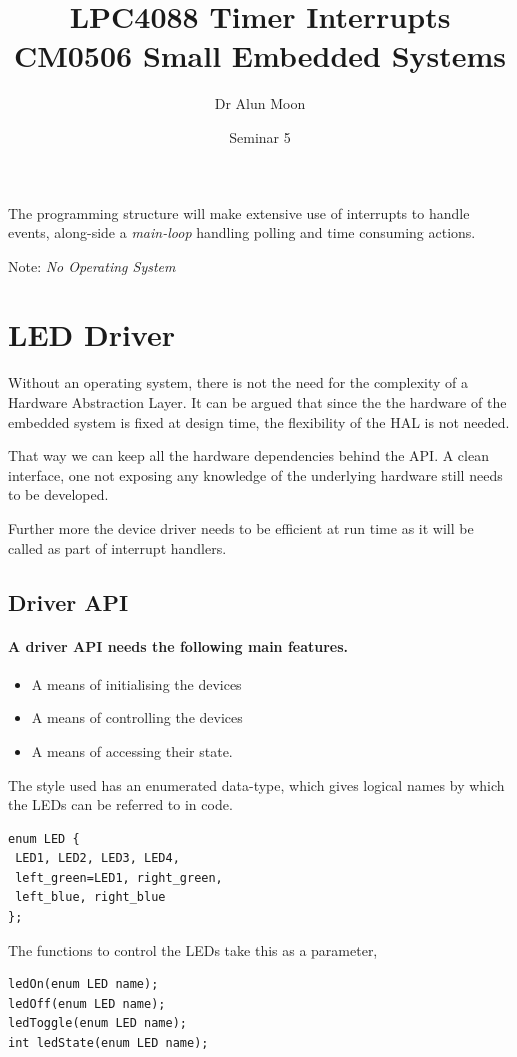 \documentclass[a4paper]{tufte-handout}
\title{LPC4088 Timer Interrupts\\\small{CM0506 Small Embedded Systems}}
\author{Dr Alun Moon}
\date{Seminar 5}
\begin{document}
\maketitle

The programming structure will make extensive use of interrupts to
handle events, along-side a \emph{main-loop} handling polling and time
consuming actions.

Note: \emph{No Operating System}

\section{LED Driver}
Without an operating system, there is not the need for the complexity
of a Hardware Abstraction Layer.  It can be argued that since the the
hardware of the embedded system is fixed at design time, the
flexibility of the HAL is not needed.
 
  That way we can keep all the hardware dependencies behind
the API.  A clean interface, one not exposing any knowledge of the
underlying hardware still needs to be developed.

Further more the device driver needs to be efficient at run time as it
will be called as part of interrupt handlers.

\subsection{Driver API}
\paragraph{A driver API needs the following main features.}
\begin{itemize}
\item A means of initialising the devices
\item A means of controlling the devices
\item A means of accessing their state.
\end{itemize}

The style used has an enumerated data-type, which gives logical names by
which the LEDs can be referred to in code.
\begin{verbatim}
enum LED {
 LED1, LED2, LED3, LED4,
 left_green=LED1, right_green,
 left_blue, right_blue
};
\end{verbatim}
The functions to control the LEDs take this as a parameter,
\begin{verbatim}
ledOn(enum LED name);
ledOff(enum LED name);
ledToggle(enum LED name);
int ledState(enum LED name);
\end{verbatim}
\end{document}
